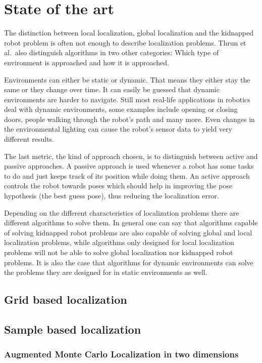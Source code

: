 \documentclass[Thesis.tex]{subfiles}
\begin{document}
\chapter{State of the art}
The distinction between local localization, global localization and the kidnapped robot problem is often not enough to describe localization problems. Thrun et al.\ also distinguish algorithms in two other categories: Which type of environment is approached and how it is approached\cite{ThrunBurgardFox:2005}.

Environments can either be static or dynamic. That means they either stay the same or they change over time. It can easily be guessed that dynamic environments are harder to navigate. Still most real-life applications in robotics deal with dynamic environments, some examples include opening or closing doors, people walking through the robot's path and many more. Even changes in the environmental lighting can cause the robot's sensor data to yield very different results. 

The last metric, the kind of approach chosen, is to distinguish between active and passive approaches. A passive approach is used whenever a robot has some tasks to do and just keeps track of its position while doing them. An active approach controls the robot towards poses which should help in improving the pose hypothesis (the best guess pose), thus reducing the localization error.

Depending on the different characteristics of localization problems there are different algorithms to solve them. In general one can say that algorithms capable of solving kidnapped robot problems are also capable of solving global and local localization problems, while algorithms only designed for local localization problems will not be able to solve global localization nor kidnapped robot problems. It is also the case that algorithms for dynamic environments can solve the problems they are designed for in static environments as well. 

\section{Grid based localization}


\section{Sample based localization}


\subsection{Augmented Monte Carlo Localization in two dimensions}
\end{document}
